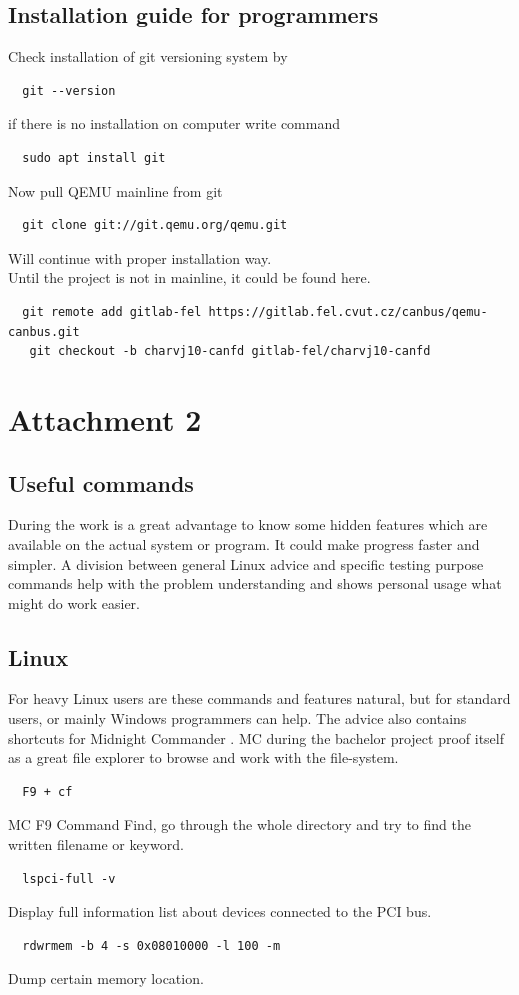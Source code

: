 \documentclass{ctuthesis}
\begin{document}
 \section{Installation guide for programmers}
  Check installation of git versioning system by
  \begin{verbatim}  git --version\end{verbatim}
  if there is no installation on computer write command
  \begin{verbatim}  sudo apt install git\end{verbatim}
  Now pull QEMU mainline from git
 \begin{verbatim}  git clone git://git.qemu.org/qemu.git\end{verbatim}
  Will continue with proper installation way. \\
  Until the project is not in mainline, it could be found here.
  \begin{verbatim}  git remote add gitlab-fel https://gitlab.fel.cvut.cz/canbus/qemu-canbus.git
   git checkout -b charvj10-canfd gitlab-fel/charvj10-canfd\end{verbatim}

\chapter{Attachment 2}

 \section{Useful commands}
  During the work is a great advantage to know some hidden features which are available on the actual system or program. It could make progress faster and simpler. A division between general Linux advice and specific testing purpose commands help with the problem understanding and shows personal usage what might do work easier.
 \section{Linux}
  For heavy Linux users are these commands and features natural, but for standard users, or mainly Windows programmers can help. The advice also contains shortcuts for Midnight Commander \cite{mc}. MC during the bachelor project proof itself as a great file explorer to browse and work with the file-system.
  \begin{verbatim}  F9 + cf\end{verbatim}
  MC F9 Command Find, go through the whole directory and try to find the written filename or keyword.
  \begin{verbatim}  lspci-full -v\end{verbatim}
  Display full information list about devices connected to the PCI bus.
  \begin{verbatim}  rdwrmem -b 4 -s 0x08010000 -l 100 -m\end{verbatim}
  Dump certain memory location. \cite{rdwrmem}
 
\end{document}
